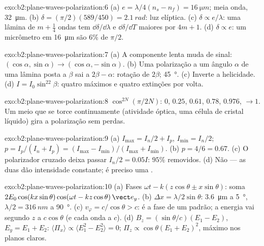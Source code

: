 \begin{solution}{exo:b2:plane-waves-polarization:6}
(a) $e = \lambda/4(n_s - n_f) = \qty{16}{\micro m}$; meia onda, \qty{32}{\micro m}. (b) $\delta =
(\pi/2)(589/450) = \qty{2.1}{rad}$: luz elíptica. (c) $\delta \propto e/\lambda$: uma
lâmina de $m + \tfrac14$ ondas tem $\dd\delta/\dd\lambda$ e $\dd\delta/\dd T$ maiores por
$4m + 1$. (d) $\delta \propto e$: um micrômetro em \qty{16}{\micro m} são $6\%$ de $\pi/2$.
\end{solution}

\begin{solution}{exo:b2:plane-waves-polarization:7}
(a) A componente lenta muda de sinal: $(\cos\alpha, \sin\alpha) \to (\cos\alpha,
-\sin\alpha)$. (b) Uma polarização a um ângulo $\alpha$ de uma lâmina posta a $\beta$ sai
a $2\beta - \alpha$: rotação de $2\beta$; \qty{45}{\degree}. (c) Inverte a
helicidade. (d) $I = I_0\sin^22\beta$: quatro máximos e quatro extinções
por volta.
\end{solution}

\begin{solution}{exo:b2:plane-waves-polarization:8}
$\cos^{2N}(\pi/2N)$: $0$, $0.25$, $0.61$, $0.78$, $0.976$, $\to 1$. Um
meio que se torce continuamente (atividade óptica, uma célula de cristal líquido)
gira a polarização sem perdas.
\end{solution}

\begin{solution}{exo:b2:plane-waves-polarization:9}
(a) $I_{\max} = I_n/2 + I_p$, $I_{\min} = I_n/2$; $p = I_p/(I_n + I_p) = (I_{\max} -
I_{\min})/(I_{\max} + I_{\min})$. (b) $p = 4/6 = 0.67$. (c) O polarizador cruzado
deixa passar $I_n/2 = 0.05I$: $95\%$ removidos. (d) Não --- as duas dão intensidade
constante; é preciso uma .
\end{solution}

\begin{solution}{exo:b2:plane-waves-polarization:10}
(a) Fases $\omega t - k(z\cos\theta \pm x\sin\theta)$: soma $2E_0\cos(kx\sin\theta)\cos(\omega t
- kz\cos\theta)\,\vect e_y$. (b) $\Delta x = \lambda/2\sin\theta$: \qty{3.6}{\micro m} a \qty{5}{\degree},
$\lambda/2 = \qty{316}{nm}$ a \qty{90}{\degree}. (c) $v_\varphi = c/\cos\theta > c$: é a fase de
um padrão; a energia vai segundo $z$ a $c\cos\theta$ (e cada onda a $c$).
(d) $B_z = (\sin\theta/c)(E_1 - E_2)$, $E_y = E_1 + E_2$: $\langle\Pi_x\rangle \propto
\langle E_1^2 - E_2^2\rangle = 0$; $\Pi_z \propto \cos\theta(E_1 + E_2)^2$, máximo nos
planos claros.
\end{solution}

